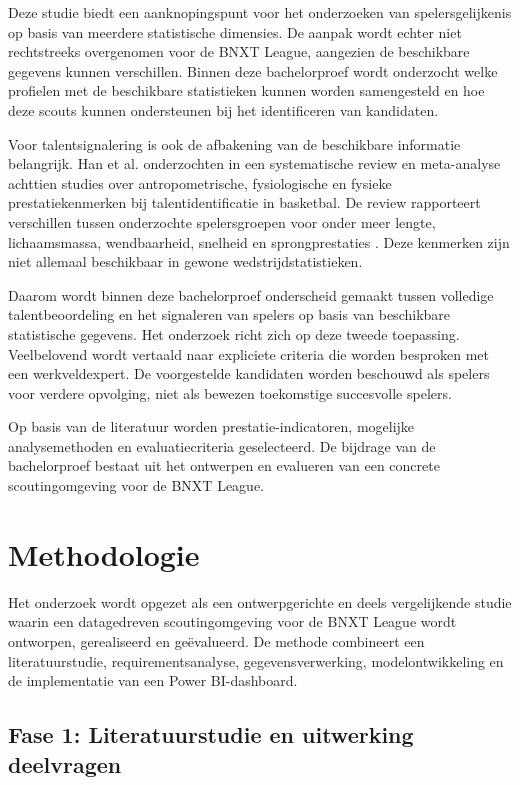 Deze studie biedt een aanknopingspunt voor het onderzoeken van spelersgelijkenis op basis van meerdere statistische dimensies. De aanpak wordt echter niet rechtstreeks overgenomen voor de BNXT League, aangezien de beschikbare gegevens kunnen verschillen. Binnen deze bachelorproef wordt onderzocht welke profielen met de beschikbare statistieken kunnen worden samengesteld en hoe deze scouts kunnen ondersteunen bij het identificeren van kandidaten.

Voor talentsignalering is ook de afbakening van de beschikbare informatie belangrijk. Han et al. onderzochten in een systematische review en meta-analyse achttien studies over antropometrische, fysiologische en fysieke prestatiekenmerken bij talentidentificatie in basketbal. De review rapporteert verschillen tussen onderzochte spelersgroepen voor onder meer lengte, lichaamsmassa, wendbaarheid, snelheid en sprongprestaties \autocite{han2023basketball}. Deze kenmerken zijn niet allemaal beschikbaar in gewone wedstrijdstatistieken.

Daarom wordt binnen deze bachelorproef onderscheid gemaakt tussen volledige talentbeoordeling en het signaleren van spelers op basis van beschikbare statistische gegevens. Het onderzoek richt zich op deze tweede toepassing. Veelbelovend wordt vertaald naar expliciete criteria die worden besproken met een werkveldexpert. De voorgestelde kandidaten worden beschouwd als spelers voor verdere opvolging, niet als bewezen toekomstige succesvolle spelers.

Op basis van de literatuur worden prestatie-indicatoren, mogelijke analysemethoden en evaluatiecriteria geselecteerd. De bijdrage van de bachelorproef bestaat uit het ontwerpen en evalueren van een concrete scoutingomgeving voor de BNXT League.

\section{Methodologie}%
\label{sec:methodologie}

Het onderzoek wordt opgezet als een ontwerpgerichte en deels vergelijkende studie waarin een datagedreven scoutingomgeving voor de BNXT League wordt ontworpen, gerealiseerd en geëvalueerd. De methode combineert een literatuurstudie, requirementsanalyse, gegevensverwerking, modelontwikkeling en de implementatie van een Power BI-dashboard.

\subsection{Fase 1: Literatuurstudie en uitwerking deelvragen}

